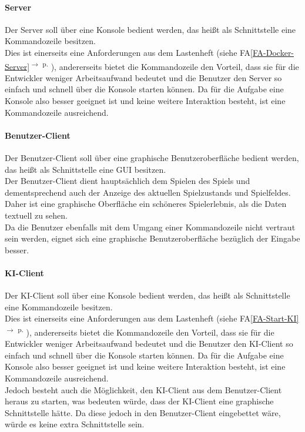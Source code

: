 \documentclass[12pt]{article}
\newcounter{fa}
\newcounter{nfa}
\newcommand{\faref}[1]{FA\ref{#1}\textsuperscript{$\rightarrow$ p. \pageref{#1}}}
\begin{document}
\paragraph{Server}
Der Server soll über eine Konsole bedient werden, das heißt als Schnittstelle 
eine Kommandozeile besitzen. \\ Dies ist einerseits eine Anforderungen aus dem Lastenheft (siehe \faref{FA-Docker-Server}), andererseits bietet die Kommandozeile den Vorteil, dass sie für die Entwickler weniger Arbeitsaufwand bedeutet und die Benutzer den Server so einfach und schnell über die Konsole starten können. Da für die Aufgabe eine Konsole also besser geeignet ist und keine weitere Interaktion besteht, ist eine Kommandozeile ausreichend. 

\paragraph{Benutzer-Client}
Der Benutzer-Client soll über eine graphische Benutzeroberfläche bedient werden, das heißt als Schnittstelle 
eine GUI besitzen. \\ Der Benutzer-Client dient hauptsächlich dem Spielen des Spiels und dementsprechend auch der Anzeige des aktuellen Spielzustands und Spielfeldes. Daher ist eine graphische Oberfläche ein schöneres Spielerlebnis, als die Daten textuell zu sehen. \\ Da die Benutzer ebenfalls mit dem Umgang einer Kommandozeile nicht vertraut sein werden, eignet sich eine graphische Benutzeroberfläche bezüglich der Eingabe besser. 

\paragraph{KI-Client}
Der KI-Client soll über eine Konsole bedient werden, das heißt als Schnittstelle 
eine Kommandozeile besitzen. \\ Dies ist einerseits eine Anforderungen aus dem Lastenheft (siehe \faref{FA-Start-KI}), andererseits bietet die Kommandozeile den Vorteil, dass sie für die Entwickler weniger Arbeitsaufwand bedeutet und die Benutzer den KI-Client so einfach und schnell über die Konsole starten können. Da für die Aufgabe eine Konsole also besser geeignet ist und keine weitere Interaktion besteht, ist eine Kommandozeile ausreichend. \\ Jedoch besteht auch die Möglichkeit, den KI-Client aus dem Benutzer-Client heraus zu starten, was bedeuten würde, dass der KI-Client eine graphische Schnittstelle hätte. Da diese jedoch in den Benutzer-Client eingebettet wäre, würde es keine extra Schnittstelle sein. 
\end{document}
